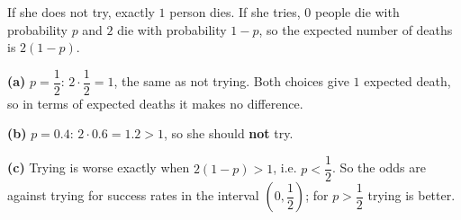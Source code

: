If she does not try, exactly $1$ person dies. If she tries, $0$ people die with probability $p$ and $2$ die with probability $1-p$, so the expected number of deaths is $2(1-p)$.

\textbf{(a)} $p=\dfrac12$: $2\cdot\dfrac12=1$, the same as not trying. Both choices give $1$ expected death, so in terms of expected deaths it makes no difference.

\textbf{(b)} $p=0.4$: $2\cdot0.6=1.2>1$, so she should \textbf{not} try.

\textbf{(c)} Trying is worse exactly when $2(1-p)>1$, i.e. $p<\dfrac12$. So the odds are against trying for success rates in the interval $\boxed{\left(0,\dfrac12\right)}$; for $p>\dfrac12$ trying is better.
